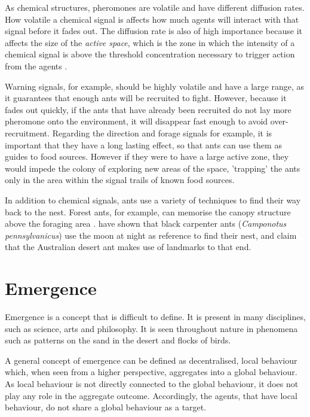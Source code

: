 As chemical structures, pheromones are volatile and have different diffusion rates. How volatile a chemical signal is affects how much agents will interact with that signal before it fades out. The diffusion rate is also of high importance because it affects the size of the \emph{active space}, which is the zone in which the intensity of a chemical signal is above the threshold concentration necessary to trigger action from the agents \cite{citeulike:3731267}.

Warning signals, for example, should be highly volatile and have a large range, as it guarantees that enough ants will be recruited to fight. However, because it fades out quickly, if the ants that have already been recruited do not lay more pheromone onto the environment, it will disappear fast enough to avoid over-recruitment. Regarding the direction and forage signals for example, it is important that they have a long lasting effect, so that ants can use them as guides to food sources. However if they were to have a large active zone, they would impede the colony of exploring new areas of the space, 'trapping' the ants only in the area within the signal trails of known food sources.

In addition to chemical signals, ants use a variety of techniques to find their way back to the nest. Forest ants, for example, can memorise the canopy structure above the foraging area \cite{ehmer1999}. \citeauthor{Klotz1993} \cite{Klotz1993} have shown that black carpenter ants (\emph{Camponotus pennsylvanicus}) use the moon at night as reference to find their nest, and \citeauthor{graham2009} \cite{graham2009} claim that the Australian desert ant makes use of landmarks to that end.

\section{Emergence}

Emergence is a concept that is difficult to define. It is present in many disciplines, such as science, arts and philosophy. It is seen throughout nature in phenomena such as patterns on the sand in the desert and flocks of birds.

A general concept of emergence can be defined as decentralised, local behaviour which, when seen from a higher perspective, aggregates into a global behaviour. As local behaviour is not directly connected to the global behaviour, it does not play any role in the aggregate outcome. Accordingly, the agents, that have local behaviour, do not share a global behaviour as a target.

